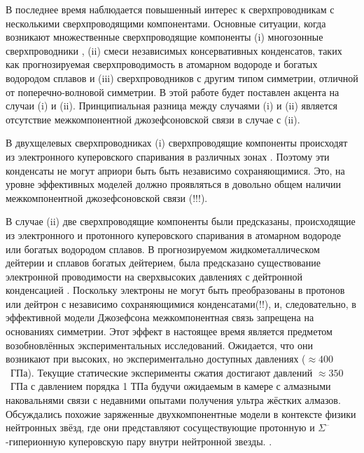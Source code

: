 В последнее время наблюдается повышенный интерес к сверхпроводникам с 
несколькими сверхпроводящими компонентами. Основные ситуации, когда возникают 
множественные сверхпроводящие компоненты (i) многозонные сверхпроводники
\cite{bib:6,bib:7,bib:8,bib:9,bib:10,bib:11}, (ii) смеси независимых 
консервативных конденсатов, таких как прогнозируемая сверхпроводимость в 
атомарном водороде и богатых водородом сплавов \cite{bib:12,bib:13,bib:14} и 
(iii) сверхпроводников с другим типом симметрии, отличной от 
поперечно-волновой симметрии. В этой работе будет поставлен акцента на случаи 
(i) и (ii). Принципиальная разница между случаями (i) и (ii) является 
отсутствие межкомпонентной джозефсоновской связи в случае с (ii).

В двухщелевых сверхпроводниках (i) сверхпроводящие компоненты происходят из
электронного куперовского спаривания в различных зонах \cite{bib:6}. Поэтому 
эти конденсаты не могут априори быть быть независимо сохраняющимися. Это, на 
уровне эффективных моделей должно проявляться в довольно общем наличии 
межкомпонентной джозефсоновской связи (!!!).

В случае (ii) две сверхпроводящие компоненты были предсказаны, происходящие 
из электронного и протонного куперовского спаривания в атомарном водороде 
или богатых водородом сплавов. В прогнозируемом жидкометаллическом дейтерии и 
сплавов богатых дейтерием, была предсказано существование электронной 
проводимости на сверхвысоких давлениях с дейтронной конденсацией  
\cite{bib:12,bib:13,bib:14}. Поскольку электроны не могут быть преобразованы в 
протонов или дейтрон с независимо сохраняющимися конденсатами(!!), и, 
следовательно, в эффективной модели Джозефсона межкомпонентная связь запрещена 
на основаниях симметрии. Этот эффект в настоящее время является предметом 
возобновлённых экспериментальных исследований. Ожидается, что они возникают 
при высоких, но экспериментально доступных давлениях (\( \approx 400 \)~ГПа). 
Текущие статические эксперименты сжатия достигают давлений 
\( \approx 350 \)~ГПа с давлением порядка 1 ТПа будучи ожидаемым в камере с 
алмазными наковальнями связи с недавними опытами получения ультра жёстких 
алмазов. Обсуждались похожие заряженные двухкомпонентные модели в контексте 
физики нейтронных звёзд, где они представляют сосуществующие протонную и 
\( \Sigma^\text{--} \)-гиперионную куперовскую пару внутри нейтронной звезды.
\cite{bib:15}. 

